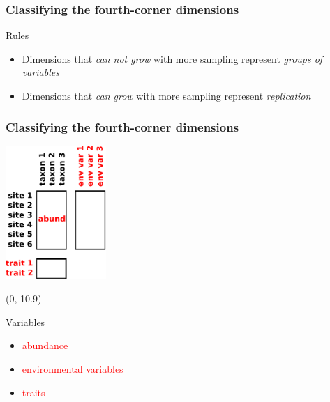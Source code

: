 \documentclass{beamer}
\numberwithin{exercise}{section}
\begin{document}
\begin{frame}
\frametitle{Classifying the fourth-corner dimensions}
\begin{center}
\begin{block}{Rules}
\begin{itemize}
\item Dimensions that \emph{can not grow} with more sampling represent \emph{groups of variables}
\pause
\item Dimensions that \emph{can grow} with more sampling represent \emph{replication}
\end{itemize}
\end{block}
\end{center}
\end{frame}

\begin{frame}
\frametitle{Classifying the fourth-corner dimensions}
\begin{center}
\includegraphics[width=3.8cm]{forthcornerVARIABLES}
\begin{textblock}{4}(0,-10.9)
\begin{block}{Variables}
\begin{itemize}
\item \textcolor{red}{abundance}
\item \textcolor{red}{environmental variables}
\item \textcolor{red}{traits}
\end{itemize}
\end{block}
\end{textblock}
\end{center}
\end{frame}
\end{document}
